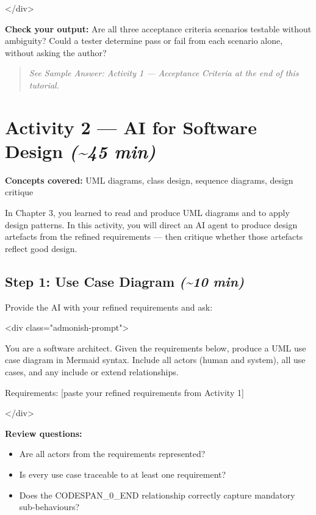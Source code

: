 \documentclass[11pt,a4paper]{book}
\begin{document}
</div>

\textbf{Check your output:} Are all three acceptance criteria scenarios testable without ambiguity? Could a tester determine pass or fail from each scenario alone, without asking the author?

\begin{quote}
\textit{See Sample Answer: Activity 1 --- Acceptance Criteria at the end of this tutorial.}
\end{quote}

\medskip

\section{Activity 2 --- AI for Software Design \textit{(\textasciitilde{}45 min)}}

\textbf{Concepts covered:} UML diagrams, class design, sequence diagrams, design critique

In Chapter 3, you learned to read and produce UML diagrams and to apply design patterns. In this activity, you will direct an AI agent to produce design artefacts from the refined requirements --- then critique whether those artefacts reflect good design.

\subsection{Step 1: Use Case Diagram \textit{(\textasciitilde{}10 min)}}

Provide the AI with your refined requirements and ask:

<div class="admonish-prompt">

You are a software architect. Given the requirements below, produce a UML use case diagram in Mermaid syntax. Include all actors (human and system), all use cases, and any include or extend relationships.

Requirements: [paste your refined requirements from Activity 1]

</div>

\textbf{Review questions:}
\begin{itemize}
  \item Are all actors from the requirements represented?
  \item Is every use case traceable to at least one requirement?
  \item Does the CODESPAN\_0\_END relationship correctly capture mandatory sub-behaviours?
\end{itemize}
\end{document}
